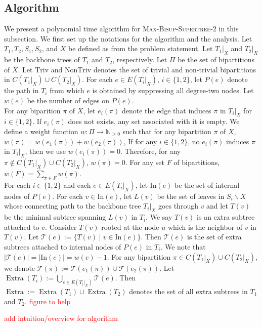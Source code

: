 \documentclass{bmcart}
\newcommand{\note}[1]{\textcolor{red}{#1}}
\newcommand{\In}{\mathrm{In}}
\newcommand{\triv}{\mathrm{Triv}}
\newcommand{\ntriv}{\mathrm{NonTriv}}
\DeclareMathOperator*{\extra}{Extra}
\begin{document}
\subsection{Algorithm}
We present a polynomial time algorithm for \textsc{Max-Bisup-Supertree-$2$} in this subsection. We first set up the notations for the algorithm and the analysis. Let $T_1,T_2,S_1,S_2$, and $X$ be defined as from the problem statement. Let $T_1|_X$ and $T_2|_X$ be the backbone trees of $T_1$ and $T_2$, respectively. Let $\Pi$ be the set of bipartitions of $X$. Let $\triv$ and $\ntriv$ denotes the set of trivial and non-trivial bipartitions in $C(T_1|_X) \cup C(T_2|_X)$. For each $e \in E(T_i|_X)$, $i \in \{1,2\}$, let $P(e)$ denote the path in $T_i$ from which $e$ is obtained by suppressing all degree-two nodes. Let $w(e)$ be the number of edges on $P(e)$. \\

For any biparition $\pi$ of $X$, let $e_i(\pi)$ denote the edge that induces $\pi$ in $T_i|_X$ for $i \in \{1,2\}$. If $e_i(\pi)$ does not exists, any set associated with it is empty. We define a weight function $w:\Pi \to \mathbb{N}_{\ge 0}$ such that for any bipartition $\pi$ of $X$, $w(\pi) = w(e_1(\pi)) + w(e_2(\pi))$, If for any $i \in \{1,2\}$, no $e_i(\pi)$ induces $\pi$ in $T_i|_X$, then we use $w(e_i(\pi)) = 0$. Therefore, for any $\pi \notin C(T_1|_X) \cup C(T_2|_X)$, $w(\pi) = 0$. For any set $F$ of bipartitions, $w(F) = \sum_{\pi \in F} w(\pi)$.\\

For each $i \in \{1,2\}$ and each $e \in E(T_i|_X)$, let $\In(e)$ be the set of internal nodes of $P(e)$. For each $v \in \In(e)$, let $L(v)$ be the set of leaves in $S_i \backslash X$ whose connecting path to the backbone tree $T_i|_X$ goes through $v$ and let $T(v)$ be the minimal subtree spanning $L(v)$ in $T_i$. We say $T(v)$ is an extra subtree attached to $v$. Consider $T(v)$ rooted at the node $u$ which is the neighbor of $v$ in $T(v)$. Let $\mathcal{T}(e) := \{T(v) \mid v \in \In(e)\}$. Then $\mathcal{T}(e)$ is the set of extra subtrees attached to internal nodes of $P(e)$ in $T_i$. We note that $|\mathcal{T}(e)| = |\In(e)| = w(e)-1$. For any bipartition $\pi \in C(T_1|_X) \cup C(T_2|_X)$, we denote $\mathcal{T}(\pi) := \mathcal{T}(e_1(\pi)) \cup \mathcal{T}(e_2(\pi))$. Let $\extra(T_i) := \bigcup_{e \in E(T_i|_X)} \mathcal{T}(e)$. Then $\extra := \extra(T_1) \cup \extra(T_2)$ denotes the set of all extra subtrees in $T_1$ and $T_2$. \note{figure to help}

\note{add intuition/overview for algorithm}
\end{document}
